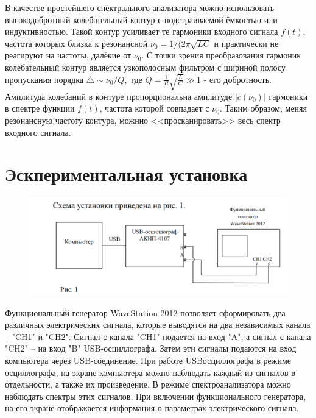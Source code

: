 \documentclass[a4paper, 12pt]{article}%
\begin{document}
В качестве простейшего спектрального анализатора можно использовать высокодобротный колебательный контур с подстраиваемой ёмкостью или индуктивностью. Такой контур усиливает те гармоники входного сигнала $f(t)$, частота которых близка к резонансной $\nu_0 = 1/(2\pi \sqrt{LC}$ и практически не реагируют на частоты, далёкие от $\nu_0$. С точки зрения преобразования гармоник колебательный контур является узкополосным фильтром с шириной полосу пропускания порядка $\bigtriangleup \sim \nu_0/Q,$ где $Q = \frac{1}{R}\sqrt{\frac{L}{C}} \gg 1$ - его добротность. Амплитуда колебаний в контуре пропорциональна амплитуде $|c(\nu_0)|$ гармоники в спектре функции $f(t)$, частота которой совпадает с $\nu_0$. Таким образом, меняя резонансную частоту контура, можнно <<просканировать>> весь спектр входного сигнала.

\section*{Эскпериментальная установка}

\begin{figure}[h!]
\centering
\includegraphics[scale=0.6]{images/scheme.png}
\label{fig:Image1}
\end{figure}

Функциональный генератор WaveStation 2012 позволяет сформировать два
различных электрических сигнала, которые выводятся на два независимых
канала – "CH1" и "CH2". Сигнал с канала "CH1" подается на вход "A", а
сигнал с канала "CH2" – на вход "B" USB-осциллографа. Затем эти сигналы подаются на вход компьютера через USB-соединение. При работе USBосциллографа в режиме осциллографа, на экране компьютера можно
наблюдать каждый из сигналов в отдельности, а также их произведение.
В режиме спектроанализатора можно наблюдать спектры этих сигналов. При включении функционального генератора, на его экране отображается информация о параметрах электрического сигнала.
\end{document}
